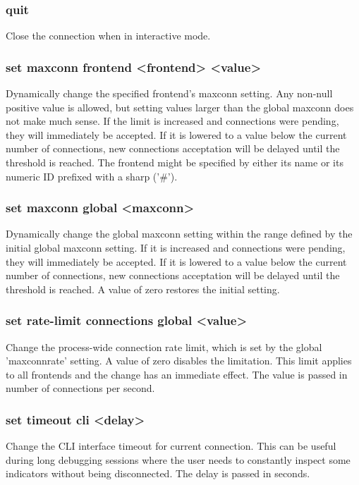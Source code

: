 \subsubsection[quit]{quit}
  Close the connection when in interactive mode.

\subsubsection[set maxconn frontend]{set maxconn frontend <frontend> <value>}
  Dynamically change the specified frontend's maxconn setting. Any non-null
  positive value is allowed, but setting values larger than the global maxconn
  does not make much sense. If the limit is increased and connections were
  pending, they will immediately be accepted. If it is lowered to a value below
  the current number of connections, new connections acceptation will be
  delayed until the threshold is reached. The frontend might be specified by
  either its name or its numeric ID prefixed with a sharp ('\#').

\subsubsection[set maxconn global]{set maxconn global <maxconn>}
  Dynamically change the global maxconn setting within the range defined by the
  initial global maxconn setting. If it is increased and connections were
  pending, they will immediately be accepted. If it is lowered to a value below
  the current number of connections, new connections acceptation will be
  delayed until the threshold is reached. A value of zero restores the initial
  setting.

\subsubsection[set rate-limit connections global]{set rate-limit connections global <value>}
  Change the process-wide connection rate limit, which is set by the global
  'maxconnrate' setting. A value of zero disables the limitation. This limit
  applies to all frontends and the change has an immediate effect. The value
  is passed in number of connections per second.

\subsubsection[set timeout cli]{set timeout cli <delay>}
  Change the CLI interface timeout for current connection. This can be useful
  during long debugging sessions where the user needs to constantly inspect
  some indicators without being disconnected. The delay is passed in seconds.

